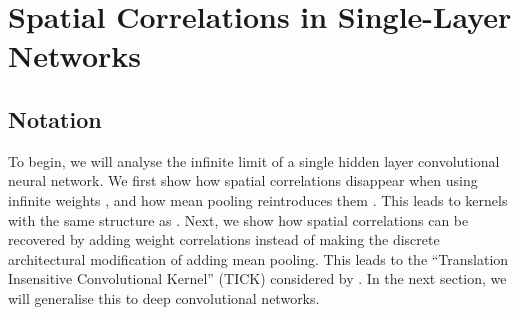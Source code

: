 \documentclass{article}
\theoremstyle{definition}
\begin{document}


\section{Spatial Correlations in Single-Layer Networks}
\subsection{Notation}
To begin, we will analyse the infinite limit of a single hidden layer
convolutional neural network. We first show how spatial correlations disappear
when using infinite weights \citep{garriga2018infiniteconv,novak2019infiniteconv}, and how mean pooling reintroduces them \citep{novak2019infiniteconv}. This leads to kernels with the same structure as . Next, we show how spatial correlations can be recovered by adding weight correlations instead of making the discrete architectural modification of adding mean pooling. This leads to the 
``Translation Insensitive Convolutional Kernel'' (TICK) considered by \citet{dutordoir2020}. In the next section, we will generalise this to deep convolutional networks.
\end{document}
